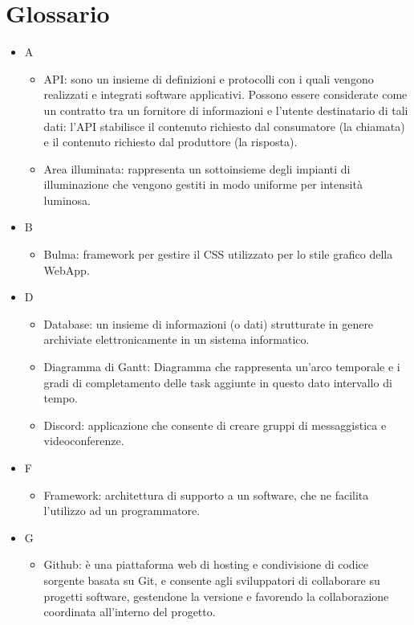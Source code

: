 \documentclass[12pt]{article}
\begin{document}
\section{Glossario}
\begin{itemize}
    \item[] A
    \begin{itemize}
        \item API: sono un insieme di definizioni e protocolli con i quali vengono realizzati e integrati software applicativi. Possono essere considerate come un contratto tra un fornitore di informazioni e l'utente destinatario di tali dati: l'API stabilisce il contenuto richiesto dal consumatore (la chiamata) e il contenuto richiesto dal produttore (la risposta).
        \item Area illuminata: rappresenta un sottoinsieme degli impianti di illuminazione che vengono gestiti in modo uniforme per intensità luminosa.
    \end{itemize}
    \item[] B
    \begin{itemize}
        \item Bulma: framework per gestire il CSS utilizzato per lo stile grafico della WebApp.
    \end{itemize}
    \item[] D
    \begin{itemize}
        \item Database: un insieme di informazioni (o dati) strutturate in genere archiviate elettronicamente in un sistema informatico.
        \item Diagramma di Gantt: Diagramma che rappresenta un'arco temporale e i gradi di completamento delle task aggiunte in questo dato intervallo di tempo.
        \item Discord: applicazione che consente di creare gruppi di messaggistica e videoconferenze.
    \end{itemize}
    \item[] F
    \begin{itemize}
        \item Framework: architettura di supporto a un software, che ne facilita l’utilizzo ad un programmatore.
    \end{itemize}
    \item[] G
    \begin{itemize}
        \item Github: è una piattaforma web di hosting e condivisione di codice sorgente basata su Git, e consente agli sviluppatori di collaborare su progetti software, gestendone la versione e favorendo la collaborazione coordinata all’interno del progetto.

\end{itemize}
\end{itemize}
\end{document}
